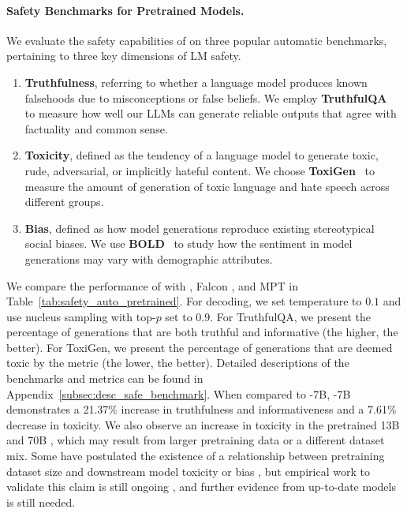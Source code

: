 \paragraph{Safety Benchmarks for Pretrained Models.} 
\label{sec:safety_pretrain_bench}
We evaluate the safety capabilities of \cinnamon on three popular automatic benchmarks, pertaining to three key dimensions of LM safety.

\begin{enumerate}
    \item \textbf{Truthfulness}, referring to whether a language model produces known falsehoods due to misconceptions or false beliefs. We employ \textbf{TruthfulQA}~\citep{lin2021truthfulqa} to measure how well our LLMs can generate reliable outputs that agree with factuality and common sense. 
    \item \textbf{Toxicity}, defined as the tendency of a language model to generate toxic, rude, adversarial, or implicitly hateful content.  We choose \textbf{ToxiGen}~\citep{hartvigsen2022toxigen} to measure the amount of generation of toxic language and hate speech across different groups.
    \item \textbf{Bias}, defined as how model generations reproduce existing stereotypical social biases. 
    We use \textbf{BOLD}~\citep{dhamala2021bold} to study how the sentiment in model generations may vary with demographic attributes.
\end{enumerate}


We compare the performance of \cinnamon with \anise \citep{Touvron2023LLaMAOA}, Falcon \citep{falcon40b}, and MPT \citep{MosaicML2023Introducing} in Table~\ref{tab:safety_auto_pretrained}. For decoding, we set temperature to $0.1$ and use nucleus sampling \citep{nucleus_sampling} with top-$p$ set to $0.9$. For TruthfulQA, we present the percentage of generations that are both truthful and informative (the higher, the better). For ToxiGen, we present the percentage of generations that are deemed toxic by the metric (the lower, the better).  
Detailed descriptions of the benchmarks and metrics can be found in Appendix~\ref{subsec:desc_safe_benchmark}. 
When compared to \anise-7B, \cinnamon-7B demonstrates 
a 21.37\% increase in truthfulness and informativeness and 
a 7.61\% decrease in toxicity. 
We also observe an increase in toxicity in the pretrained 13B and 70B \cinnamon{}, which may result from larger pretraining data or a different dataset mix. Some have postulated the existence of a relationship between pretraining dataset size and downstream model toxicity or bias \citep{bender2021dangers}, but empirical work to validate this claim is still ongoing \citep{dodge-etal-2021-documenting, smith2021hi, tal-etal-2022-fewer}, and further evidence from up-to-date models is still needed. 

